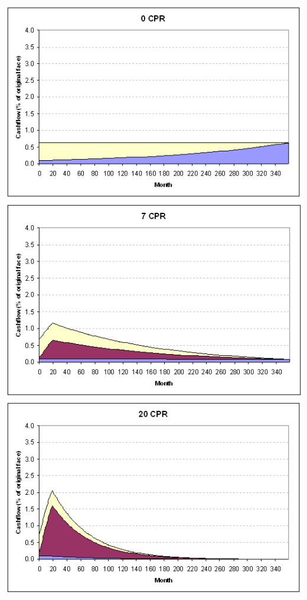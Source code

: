 \documentclass[10pt,letterpaper]{article}
\begin{document}
\begin{center}
\includegraphics[scale=0.3]{0CPRchart.png}
\includegraphics[scale=0.3]{7CPRchart.png}\\
\includegraphics[scale=0.3]{20CPRchart.png}

\end{center}
\end{document}
